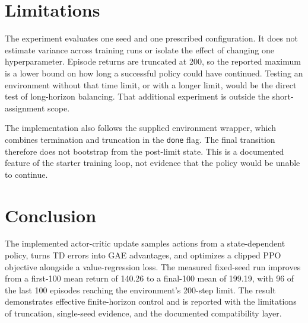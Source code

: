 \documentclass{article}
\begin{document}
\section{Limitations}\label{sec:limits}

The experiment evaluates one seed and one prescribed configuration. It does
not estimate variance across training runs or isolate the effect of changing
one hyperparameter. Episode returns are truncated at 200, so the reported
maximum is a lower bound on how long a successful policy could have continued.
Testing an environment without that time limit, or with a longer limit, would
be the direct test of long-horizon balancing. That additional experiment is
outside the short-assignment scope.

The implementation also follows the supplied environment wrapper, which
combines termination and truncation in the \texttt{done} flag. The final
transition therefore does not bootstrap from the post-limit state. This is a
documented feature of the starter training loop, not evidence that the policy
would be unable to continue.

\section{Conclusion}\label{sec:conclusion}

The implemented actor-critic update samples actions from a state-dependent
policy, turns TD errors into GAE advantages, and optimizes a clipped PPO
objective alongside a value-regression loss. The measured fixed-seed run
improves from a first-100 mean return of 140.26 to a final-100 mean of 199.19,
with 96 of the last 100 episodes reaching the environment's 200-step limit.
The result demonstrates effective finite-horizon control and is reported with
the limitations of truncation, single-seed evidence, and the documented
compatibility layer.

\begingroup
\small
\setlength{\bibsep}{2pt}


\endgroup
\end{document}
